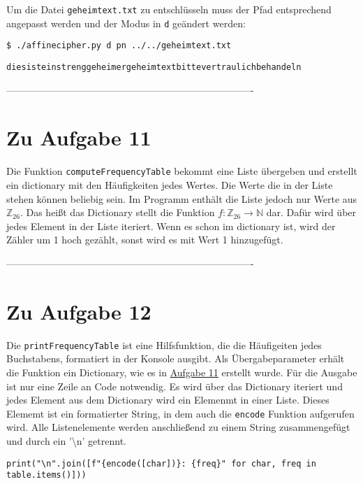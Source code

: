 \documentclass[12pt]{article}
\begin{document}
Um die Datei \texttt{geheimtext.txt} zu entschlüsseln muss der Pfad entsprechend angepasst werden und der Modus in \texttt{d} geändert werden:

\begin{lstlisting}
$ ./affinecipher.py d pn ../../geheimtext.txt
\end{lstlisting}

\begin{lstlisting}
diesisteinstrenggeheimergeheimtextbittevertraulichbehandeln
\end{lstlisting}


%
 ----------------------------------------------------------------------------
\section{Zu Aufgabe 11}
\label{sec:aufgabe_11}

Die Funktion \texttt{computeFrequencyTable} bekommt eine Liste übergeben und erstellt ein dictionary mit den Häufigkeiten jedes Wertes. Die Werte die in der Liste stehen können beliebig sein. Im Programm enthält die Liste jedoch nur Werte aus $\mathbb{Z}_{26}$. Das heißt das Dictionary stellt die Funktion $f: \mathbb{Z}_{26} \to \mathbb{N}$ dar. Dafür wird über jedes Element in der Liste iteriert. Wenn es schon im dictionary ist, wird der Zähler um 1 hoch gezählt, sonst wird es mit Wert 1 hinzugefügt.


%
 ----------------------------------------------------------------------------
\section{Zu Aufgabe 12}

Die \texttt{printFrequencyTable} ist eine Hilfsfunktion, die die Häufigeiten jedes Buchstabens, formatiert in der Konsole ausgibt. Als Übergabeparameter erhält die Funktion ein Dictionary, wie es in \hyperref[sec:aufgabe_11]{Aufgabe 11} erstellt wurde. Für die Ausgabe ist nur eine Zeile an Code notwendig. Es wird über das Dictionary iteriert und jedes Element aus dem Dictionary wird ein Elemenmt in einer Liste. Dieses Elememt ist ein formatierter String, in dem auch die \texttt{encode} Funktion aufgerufen wird. Alle Listenelemente werden anschließend zu einem String zusammengefügt und durch ein '\textbackslash n' getrennt.

\begin{lstlisting}
print("\n".join([f"{encode([char])}: {freq}" for char, freq in table.items()]))
\end{lstlisting}
\end{document}
